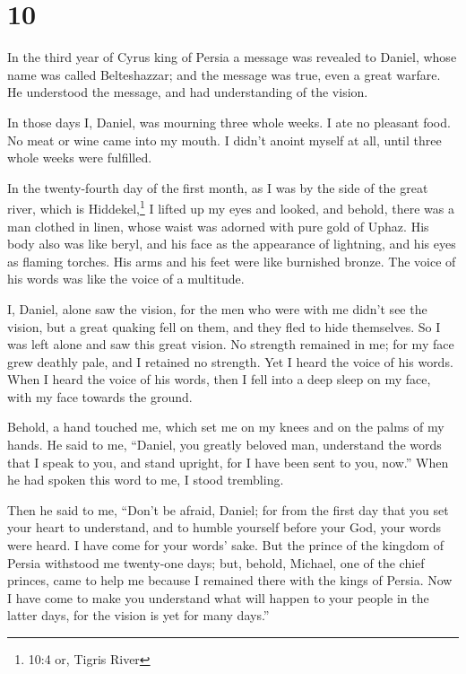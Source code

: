 \hypertarget{section-9}{%
\section{10}\label{section-9}}

 In the third year of Cyrus king of Persia a message was
revealed to Daniel, whose name was called Belteshazzar; and the message
was true, even a great warfare. He understood the message, and had
understanding of the vision.

 In those days I, Daniel, was mourning three whole weeks.
 I ate no pleasant food. No meat or wine came into my mouth.
I didn't anoint myself at all, until three whole weeks were fulfilled.

 In the twenty-fourth day of the first month, as I was by
the side of the great river, which is Hiddekel,\footnote{10:4 or, Tigris
  River}  I lifted up my eyes and looked, and behold, there
was a man clothed in linen, whose waist was adorned with pure gold of
Uphaz.  His body also was like beryl, and his face as the
appearance of lightning, and his eyes as flaming torches. His arms and
his feet were like burnished bronze. The voice of his words was like the
voice of a multitude.

 I, Daniel, alone saw the vision, for the men who were with
me didn't see the vision, but a great quaking fell on them, and they
fled to hide themselves.  So I was left alone and saw this
great vision. No strength remained in me; for my face grew deathly pale,
and I retained no strength.  Yet I heard the voice of his
words. When I heard the voice of his words, then I fell into a deep
sleep on my face, with my face towards the ground.

 Behold, a hand touched me, which set me on my knees and on
the palms of my hands.  He said to me, ``Daniel, you
greatly beloved man, understand the words that I speak to you, and stand
upright, for I have been sent to you, now.'' When he had spoken this
word to me, I stood trembling.

 Then he said to me, ``Don't be afraid, Daniel; for from
the first day that you set your heart to understand, and to humble
yourself before your God, your words were heard. I have come for your
words' sake.  But the prince of the kingdom of Persia
withstood me twenty-one days; but, behold, Michael, one of the chief
princes, came to help me because I remained there with the kings of
Persia.  Now I have come to make you understand what will
happen to your people in the latter days, for the vision is yet for many
days.''

